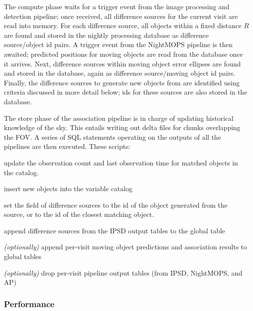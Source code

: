 The compute phase waits for a trigger event from the image processing and
detection pipeline; once received, all difference sources for the current
visit are read into memory. For each difference source, all objects within a
fixed distance $R$ are found and stored in the nightly processing database as
difference source/object id pairs. A trigger event from the NightMOPS
pipeline is then awaited; predicted positions for moving objects are read from
the database once it arrives. Next, difference sources within moving object
error ellipses are found and stored in the database, again as difference
source/moving object id pairs. Finally, the difference sources to generate new
objects from are identified using criteria discussed in more detail below; ids
for these sources are also stored in the database.

The store phase of the association pipeline is in charge of updating
historical knowledge of the sky. This entails writing out delta files for
chunks overlapping the FOV. A series of SQL statements operating on the
outputs of all the pipelines are then executed. These scripts:

\begin{itemsize}
\item update the observation count and last observation time for matched
      objects in the  catalog.

\item insert new objects into the variable  catalog

\item set the  field of difference sources to the id of the
      object generated from the source, or to the id of the closest matching
      object.

\item append difference sources from the IPSD output tables to the global
       table

\item \emph{(optionally)} append per-visit moving object predictions and
      association results to global tables

\item \emph{(optionally)} drop per-visit pipeline output tables (from IPSD,
      NightMOPS, and AP)
\end{itemsize}

\subsubsection{Performance}

